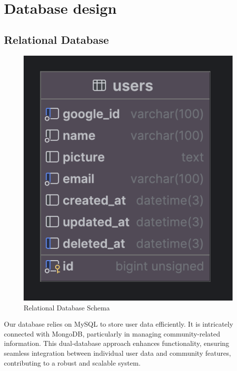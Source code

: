 \newpage
\section{Database design}
\subsection{Relational Database}
\begin{figure}[!h]
	\centering
	\includegraphics[width=0.5\linewidth]{chapter3/sql-db-schema.png}
	\caption{Relational Database Schema}
	\label{fig:Relational Database Schema}
\end{figure}
Our database relies on MySQL to store user data efficiently. It is intricately connected with MongoDB, particularly in managing community-related information. This dual-database approach enhances functionality, ensuring seamless integration between individual user data and community features, contributing to a robust and scalable system.

\newpage

